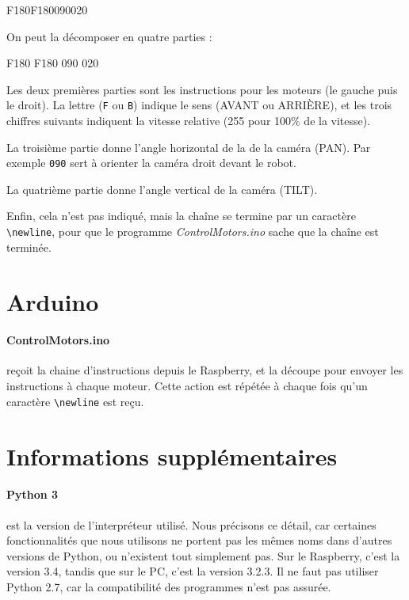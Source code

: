 \documentclass[12pt,a4paper]{report}
\begin{document}
\begin{verbatimtab}[3]
F180F180090020
\end{verbatimtab}

On peut la décomposer en quatre parties :

\begin{verbatimtab}[3]
F180 F180 090 020
\end{verbatimtab}

Les deux premières parties sont les instructions pour les moteurs (le gauche puis le droit). La lettre (\verb=F= ou \verb=B=) indique le sens (AVANT ou ARRIÈRE), et les trois chiffres suivants indiquent la vitesse relative (255 pour 100\% de la vitesse).

La troisième partie donne l'angle horizontal de la de la caméra (PAN). Par exemple \verb=090= sert à orienter la caméra droit devant le robot.

La quatrième partie donne l'angle vertical de la caméra (TILT).

Enfin, cela n'est pas indiqué, mais la chaîne se termine par un caractère \verb=\newline=, pour que le programme \textit{ControlMotors.ino} sache que la chaîne est terminée. 

\section{Arduino}

\paragraph{ControlMotors.ino} reçoit la chaine d'instructions depuis le Raspberry, et la découpe pour envoyer les instructions à chaque moteur. Cette action est répétée à chaque fois qu'un caractère \verb=\newline= est reçu.

\section{Informations supplémentaires}

\paragraph{Python 3} est la version de l'interpréteur utilisé. Nous précisons ce détail, car certaines fonctionnalités que nous utilisons ne portent pas les mêmes noms dans d'autres versions de Python, ou n'existent tout simplement pas. Sur le Raspberry, c'est la version 3.4, tandis que sur le PC, c'est la version 3.2.3. Il ne faut pas utiliser Python 2.7, car la compatibilité des programmes n'est pas assurée.
\end{document}
